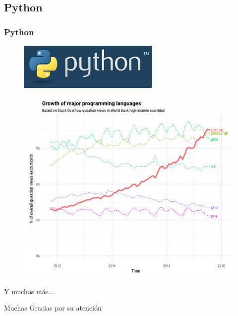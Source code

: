 \documentclass[spanish]{beamer}
\begin{document}
\subsection{Python}
\begin{frame}
	\frametitle{Python}
	\begin{figure}
		\centering
		\includegraphics[width=0.3\linewidth]{../Resumen/python}
	\end{figure}
	\begin{figure}
		\centering
		\includegraphics[width=0.7\linewidth]{../Resumen/pythontrend}
	\end{figure}
\end{frame}

\begin{frame}
	\centering
	{\LARGE Y muchos más...}
\end{frame}

\begin{frame}
	\centering
	{\LARGE Muchas Gracias por su atención}
\end{frame}
\end{document}
